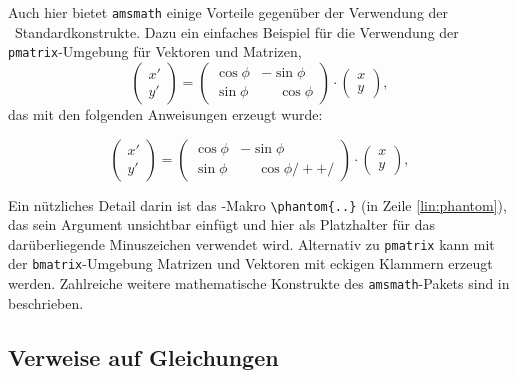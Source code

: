 Auch hier bietet \texttt{amsmath} einige Vorteile gegenüber der Verwendung
der \latex\ Standardkonstrukte. Dazu ein einfaches Beispiel für die
Verwendung der \texttt{pmatrix}-Umgebung für Vektoren und Matrizen,
%
\begin{equation}
	\begin{pmatrix}
		x' \\ y'
	\end{pmatrix}
	=
	\begin{pmatrix}
		\cos \phi & -\sin \phi           \\
		\sin \phi & \phantom{-}\cos \phi
	\end{pmatrix}
	\cdot
	\begin{pmatrix}
		x \\ y
	\end{pmatrix} ,
\end{equation}
%
das mit den folgenden Anweisungen erzeugt wurde:
%
\begin{LaTeXCode}
\begin{equation}
	\begin{pmatrix} 
			x' \\ 
			y' 
	\end{pmatrix}
	= 
	\begin{pmatrix}
		  \cos \phi &           -\sin \phi \\
		  \sin \phi & \phantom{-}\cos \phi /+ \label{lin:phantom} +/
	\end{pmatrix} 
	\cdot
	\begin{pmatrix} 
			x \\ 
			y 
	\end{pmatrix} ,
\end{equation}
\end{LaTeXCode}
%
Ein nützliches Detail darin ist das \tex-Makro \verb!\phantom{..}! (in Zeile
\ref{lin:phantom}), das sein Argument unsichtbar einfügt und hier als
Platzhalter für das darüberliegende Minuszeichen verwendet wird. Alternativ
zu \texttt{pmatrix} kann mit der \texttt{bmatrix}-Umgebung Matrizen und
Vektoren mit eckigen Klammern erzeugt werden. Zahlreiche weitere
mathematische Konstrukte des \texttt{amsmath}-Pakets sind in
\cite{Mittelbach2022} beschrieben.


\subsection{Verweise auf Gleichungen}
\label{sec:VerweiseAufGleichungen}

